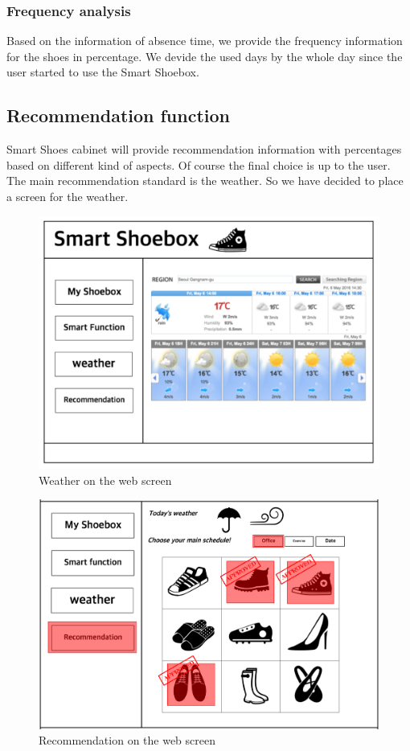 \documentclass[conference]{IEEEtran}
\begin{document}
\subsubsection{Frequency analysis}
Based on the information of absence time, we provide the frequency information for the shoes in percentage. We devide the used days by the whole day since the user started to use the Smart Shoebox.




\subsection{Recommendation function}
Smart Shoes cabinet will provide recommendation information with percentages based on different kind of aspects. Of course the final choice is up to the user. The main recommendation standard is the weather. So we have decided to place a screen for the weather.
\begin{figure}[H]
\begin{center}
    \includegraphics[scale=0.4]{UI1}
   \caption{Weather on the web screen}\label{fig:label}
\end{center}
\end{figure}
\begin{figure}[H]
\begin{center}
    \includegraphics[scale=0.29]{UI2}
   \caption{Recommendation on the web screen}\label{fig:label}
\end{center}
\end{figure}
\end{document}
